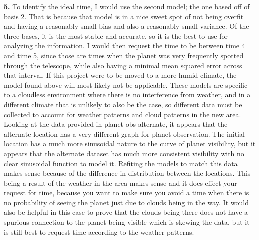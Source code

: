 \documentclass[submit]{harvardml}
\begin{document}
\textbf{5.} To identify the ideal time, I would use the second model; the one based off of 
basis 2. That is because that model is in a nice sweet spot of not being overfit and having a reasonably small bias 
and also a reasonably small variance. Of the three bases, it is the most stable and accurate, so it is the best to use for 
analyzing the information. I would then request the time to be between time 4 and time 5, since those are times when the planet was 
very frequently spotted through the telescope, while also having a minimal mean squared error across that interval. If this project were to be moved 
to a more humid climate, the model found above will most likely not be applicable. These models are specific to a cloudless environment where 
there is no interference from weather, and in a different climate that is unlikely to also be the case, so different data must be collected to account 
for weather patterns and cloud patterns in the new area. Looking at the data provided in planet-obs-alternate, it appears that the alternate location has a very different 
graph for planet observation. The initial location has a much more sinusoidal nature to the curve of planet visibility, but it appears that the alternate dataset has much more consistent
visibility with no clear sinusoidal function to model it. Refiting the models to match this data makes sense because of the difference in distribution between the locations. This being
a result of the weather in the area makes sense and it does effect your request for time, because you want to make sure you avoid a time when there is no probability of seeing the planet just due 
to clouds being in the way. It would also be helpful in this case to prove that the clouds being there does not have a spurious connection to the planet being visible which is skewing the data, 
but it is still best to request time according to the weather patterns. 

\end{document}
